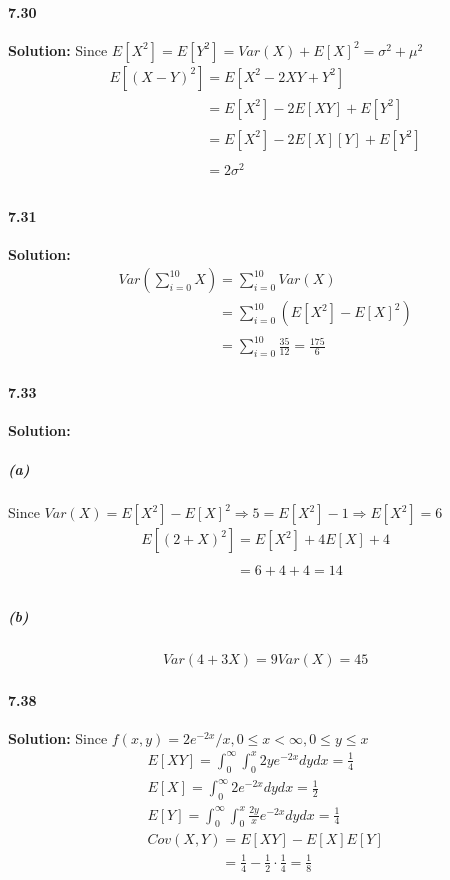 \documentclass[11pt]{article}
\begin{document}
	\paragraph{7.30}\textbf{Solution:}
	Since $E[X^2] = E[Y^2] = Var(X) + E[X]^2 = \sigma^2 + \mu^2$
		\begin{align}
			&E[(X - Y)^2] = E[X^2 - 2XY + Y^2]\nonumber\\
			&\phantom{E[(X - Y)^2]} = E[X^2] - 2E[XY] + E[Y^2]\nonumber\\
			&\phantom{E[(X - Y)^2]} = E[X^2] - 2E[X][Y] + E[Y^2]\nonumber\\
			&\phantom{E[(X - Y)^2]} = 2\sigma^2\nonumber
		\end{align}
	\paragraph{7.31}\textbf{Solution:}
		\begin{align}
			&Var(\sum_{i = 0}^{10} X) = \sum_{i = 0}^{10} Var(X)\nonumber\\
			&\phantom{Var(\sum_{i = 0}^{10} X)} = \sum_{i = 0}^{10} (E[X^2] - E[X]^2)\nonumber\\
			&\phantom{Var(\sum_{i = 0}^{10} X)} = \sum_{i = 0}^{10} \frac{35}{12} = \frac{175}{6}
		\end{align}
	\paragraph{7.33}\textbf{Solution:}
		\subparagraph{(a)}
			Since $Var(X) = E[X^2] - E[X]^2 \Rightarrow 5 = E[X^2] - 1 \Rightarrow E[X^2] = 6$
			\begin{align}
				&E[(2+X)^2] = E[X^2] + 4E[X] + 4\nonumber\\
				&\phantom{E[(2+X)^2]} = 6 + 4 + 4 = 14
			\end{align}
		\subparagraph{(b)}
			\begin{align}
				&Var(4 + 3X) = 9Var(X) = 45\nonumber
			\end{align}
	\paragraph{7.38}\textbf{Solution:}
		Since $f(x, y) = 2e^{-2x}/x, 0 \leq x < \infty, 0 \leq y \leq x$
		\begin{align}
			&E[XY] = \int_0^{\infty}\int_0^x 2ye^{-2x}dydx = \frac{1}{4} \nonumber\\
			&E[X] = \int_0^{\infty} 2e^{-2x}dydx = \frac{1}{2}\nonumber\\
			&E[Y] = \int_0^{\infty}\int_0^x \frac{2y}{x}e^{-2x}dydx = \frac{1}{4}\nonumber\\
			&Cov(X, Y) = E[XY] - E[X]E[Y]\nonumber\\
			&\phantom{Cov(X, Y)} = \frac{1}{4} - \frac{1}{2}\cdot\frac{1}{4} = \frac{1}{8}
		\end{align}
\end{document}
